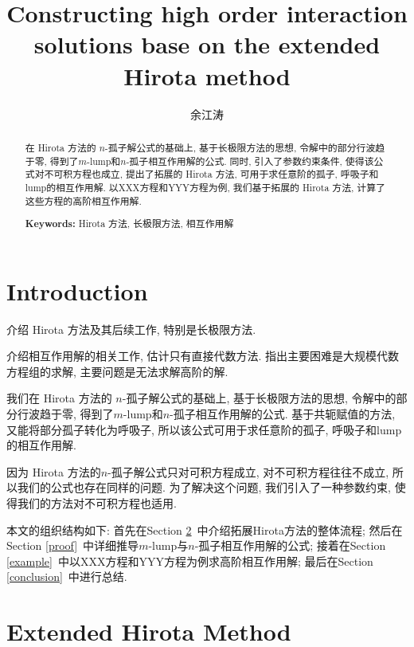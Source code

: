\documentclass[12pt,a4paper,UTF8]{article}
\numberwithin{equation}{section}
\newcommand{\refsec}[1]{Section \ref{#1}~}
\begin{document}
\title{Constructing high order interaction solutions base on the extended Hirota method}
\author{余江涛}
\maketitle
\begin{abstract}
在 Hirota 方法的 $n$-孤子解公式的基础上, 基于长极限方法的思想, 令解中的部分行波趋于零, 得到了$m$-lump和$n$-孤子相互作用解的公式. 同时, 引入了参数约束条件, 使得该公式对不可积方程也成立, 提出了拓展的 Hirota 方法, 可用于求任意阶的孤子, 呼吸子和lump的相互作用解. 以XXX方程和YYY方程为例, 我们基于拓展的 Hirota 方法, 计算了这些方程的高阶相互作用解.

\vspace{0.2cm}

{\noindent\bf Keywords:} Hirota 方法, 长极限方法, 相互作用解
\end{abstract}

\section{Introduction}
\begin{compactitem}[\textbullet]
\item 介绍 Hirota 方法及其后续工作, 特别是长极限方法. 
\item 介绍相互作用解的相关工作, 估计只有直接代数方法. 指出主要困难是大规模代数方程组的求解, 主要问题是无法求解高阶的解.
\item 我们在 Hirota 方法的 $n$-孤子解公式的基础上, 基于长极限方法的思想, 令解中的部分行波趋于零, 得到了$m$-lump和$n$-孤子相互作用解的公式. 基于共轭赋值的方法, 又能将部分孤子转化为呼吸子, 所以该公式可用于求任意阶的孤子, 呼吸子和lump的相互作用解.
\item 因为 Hirota 方法的$n$-孤子解公式只对可积方程成立, 对不可积方程往往不成立, 所以我们的公式也存在同样的问题. 为了解决这个问题, 我们引入了一种参数约束, 使得我们的方法对不可积方程也适用. 
\end{compactitem}

本文的组织结构如下: 首先在\refsec{method}中介绍拓展Hirota方法的整体流程; 然后在\refsec{proof}中详细推导$m$-lump与$n$-孤子相互作用解的公式; 接着在\refsec{example}中以XXX方程和YYY方程为例求高阶相互作用解; 最后在\refsec{conclusion}中进行总结. 

\section{Extended Hirota Method}\label{method}
\end{document}
